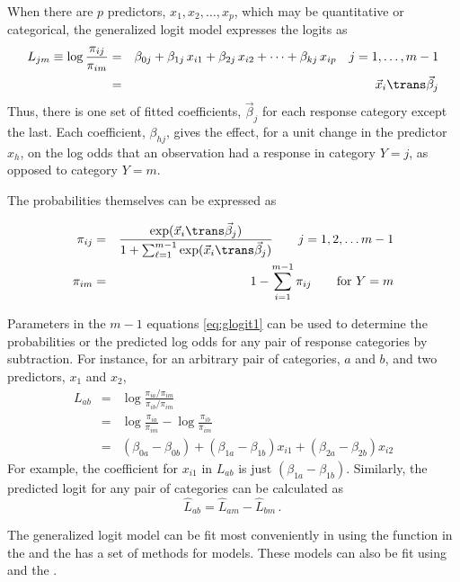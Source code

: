 \documentclass[11pt]{book}
\begin{document}
When there are $p$ predictors, \(x_1, x_2, \dots , x_p\),
which may be quantitative or categorical, the generalized logit
model expresses the logits as
\begin{eqnarray}\label{eq:glogit1}
  L_{jm}  \equiv
    \log \frac{\pi_{ij}}{\pi_{im}} & = & \beta_{0j}  +
  \beta _{1j} \,  x_{i1}  +
  \beta _{2j} \,  x_{i2}  + \cdots +
  \beta _{kj} \,  x_{ip} \quad
   j=1, \dots , m-1 \nonumber \\
  & = & {\vec{x}_i} \trans \vec{\beta}_j
\end{eqnarray}
Thus, there is one set of fitted coefficients, $\vec{\beta}_j$ for each
response category except the last.
Each coefficient, $\beta_{hj}$, gives the effect,
for a unit change in the predictor $x_h$,
on the log odds
that an observation had a response in 
category $Y=j$, as opposed to category $Y=m$.

The probabilities themselves can be expressed as

\begin{eqnarray*}
 \pi_{ij} & = &
 \frac{ \exp ( {\vec{x}_i} \trans \vec{\beta}_j ) }
      {1 + \sum_{\ell=1}^{m-1} \exp ( {\vec{x}_i} \trans \vec{\beta}_j ) }
      \quad\quad j=1, 2, \dots m-1
 \\
 \pi_{im} & = & 1 - \sum_{i=1}^{m-1} \pi_{ij} \quad\quad\mbox{for } Y=m
\end{eqnarray*}

Parameters in the $m-1$ equations \eqref{eq:glogit1} can be used to determine the
probabilities or the predicted log odds for any pair of response categories
by subtraction.
For instance, for an arbitrary pair of categories, $a$ and $b$,
and two predictors, $x_1$ and $x_2$,
\begin{eqnarray*}%
  L_{ab} & = & \log \frac{\pi_{ia}/\pi_{im}}{\pi_{ib}/\pi_{im}} \\
         & = & \log \frac{\pi_{ia}}{\pi_{im}} - \log \frac{\pi_{ib}}{\pi_{im}} \\
         & = & (\beta_{0a}-\beta_{0b}) + (\beta_{1a}-\beta_{1b}) x_{i1}
            + (\beta_{2a}-\beta_{2b}) x_{i2} 
\end{eqnarray*}
For example, the coefficient for $x_{i1}$ in $ L_{ab}$
is just $(\beta_{1a}-\beta_{1b})$.
Similarly, the predicted logit for any pair of categories
can be calculated as
\begin{equation*}
 \hat{L}_{ab} = \hat{L}_{am} - \hat{L}_{bm}
 \period
\end{equation*}

The generalized logit model can be fit most conveniently
in \R using the 
function  in the  and the
 has a set of methods for 
models.  These models can also be fit using 
and the .
\end{document}
